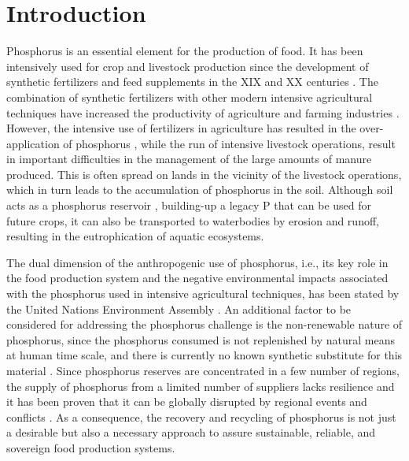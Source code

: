 \documentclass[]{elsarticle}
\begin{document}

\section{Introduction}
Phosphorus is an essential element for the production of food. It has been intensively used for crop and livestock production since the development of synthetic fertilizers and feed supplements in the XIX and XX centuries \citep{Kausar19}. The combination of synthetic fertilizers with other modern intensive agricultural techniques have increased the productivity of agriculture and farming industries \citep{pingali2012green}.
However, the intensive use of fertilizers in agriculture has resulted in the over-application of phosphorus \citep{reid2019phosphorus}, while the run of intensive livestock operations,
result in important difficulties in the management of the large amounts of manure produced. This is often spread on lands in the vicinity of the livestock operations, which in turn leads to the accumulation of phosphorus in the soil. Although soil acts as a phosphorus reservoir \citep{ehlert2003potential}, building-up a legacy P that can be used for future crops, it can also be transported to waterbodies by erosion and runoff, resulting in the eutrophication of aquatic ecosystems.

The dual dimension of the anthropogenic use of phosphorus, i.e., its key role in the food production system and the negative environmental impacts associated with the phosphorus used in intensive agricultural techniques, has been stated by the United Nations Environment Assembly
\citep{UN_Phosphorus}. An additional factor to be considered for addressing the phosphorus challenge is the non-renewable nature of phosphorus, since the phosphorus consumed is not replenished by natural means at human time scale, and there is currently no known synthetic substitute for this material \citep{cordell2009story}. Since phosphorus reserves are concentrated in a few number of regions, the supply of phosphorus from a limited number of suppliers lacks resilience and it has been proven that it can be globally disrupted by regional events and conflicts
\citep{FAO_UkraineWar}. As a consequence, the recovery and recycling of phosphorus is not just a desirable but also a necessary approach to assure sustainable, reliable, and sovereign food production systems. 
\end{document}

